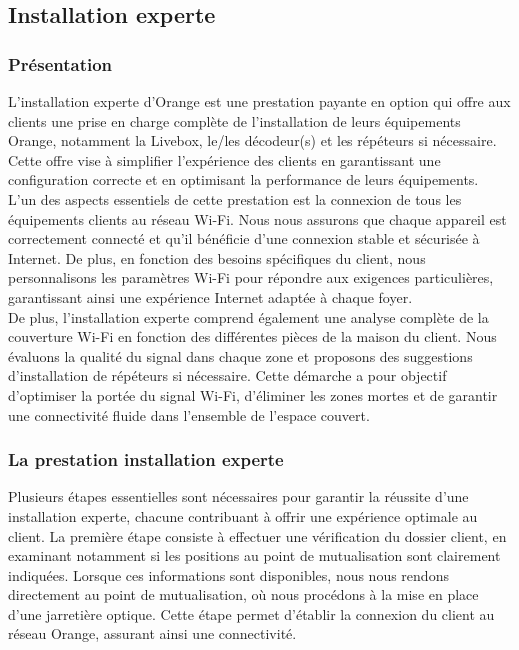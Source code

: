 \documentclass[12pt, a4paper]{article}
\begin{document}
\subsection{Installation experte}
\subsubsection{Présentation}
L'installation experte d'Orange est une
prestation payante en option qui offre aux clients
une prise en charge complète de l'installation de leurs
équipements Orange, notamment la Livebox, le/les décodeur(s)
et les répéteurs si nécessaire. Cette offre vise à simplifier
l'expérience des clients en garantissant une configuration
correcte et en optimisant la performance de leurs équipements.\\

L'un des aspects essentiels de cette prestation est la
connexion de tous les équipements clients au réseau Wi-Fi.
Nous nous assurons que chaque appareil est
correctement connecté et qu'il bénéficie d'une connexion
stable et sécurisée à Internet. De plus, en fonction des besoins
spécifiques du client, nous personnalisons les paramètres Wi-Fi
pour répondre aux exigences particulières, garantissant ainsi
une expérience Internet adaptée à chaque foyer.\\

De plus, l'installation experte comprend également une analyse
complète de la couverture Wi-Fi en fonction des différentes
pièces de la maison du client. Nous évaluons
la qualité du signal dans chaque zone et proposons des
suggestions d'installation de répéteurs si nécessaire. Cette
démarche a pour objectif d'optimiser la portée du signal Wi-Fi,
d'éliminer les zones mortes et de garantir une connectivité fluide
dans l'ensemble de l'espace couvert.
\subsubsection{La prestation installation experte}
Plusieurs étapes essentielles sont nécessaires pour garantir
la réussite d'une installation experte, chacune contribuant à offrir
une expérience optimale au client. La première étape consiste à
effectuer une vérification du dossier client, en examinant notamment
si les positions au point de mutualisation sont clairement indiquées.
Lorsque ces informations sont disponibles, nous nous rendons
directement au point de mutualisation, où nous procédons à la
mise en place d'une jarretière optique. Cette étape permet d'établir
la connexion du client au réseau Orange, assurant ainsi une connectivité.\\
\end{document}
